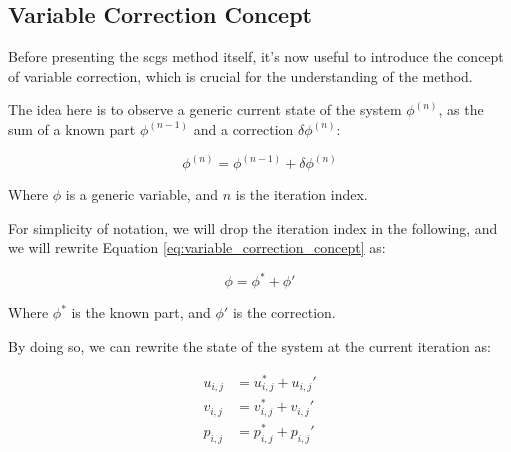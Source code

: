 \subsection{Variable Correction Concept}
\label{subsec:variable_correction_concept}

Before presenting the \acrshort{scgs} method itself, it's now useful to introduce the concept of variable correction, which is crucial for the understanding of the method.

The idea here is to observe a generic current state of the system $\phi^{(n)}$, as the sum of a known part $\phi^{(n-1)}$ and a correction $\delta \phi^{(n)}$:

\begin{equation}
    \phi^{(n)} = \phi^{(n-1)} + \delta \phi^{(n)}
    \label{eq:variable_correction_concept}
\end{equation}

Where $\phi$ is a generic variable, and $n$ is the iteration index.

For simplicity of notation, we will drop the iteration index in the following, and we will rewrite Equation \ref{eq:variable_correction_concept} as:

\begin{equation}
    \phi = \phi^* + \phi'
    \label{eq:variable_correction_concept_simplified}
\end{equation}

Where $\phi^*$ is the known part, and $\phi'$ is the correction.

By doing so, we can rewrite the state of the system at the current iteration as:

\begin{align}
    u_{i,j} & = u_{i,j}^* + u_{i,j}' \\
    v_{i,j} & = v_{i,j}^* + v_{i,j}' \\
    p_{i,j} & = p_{i,j}^* + p_{i,j}'
    \label{eq:variable_corrections}
\end{align}